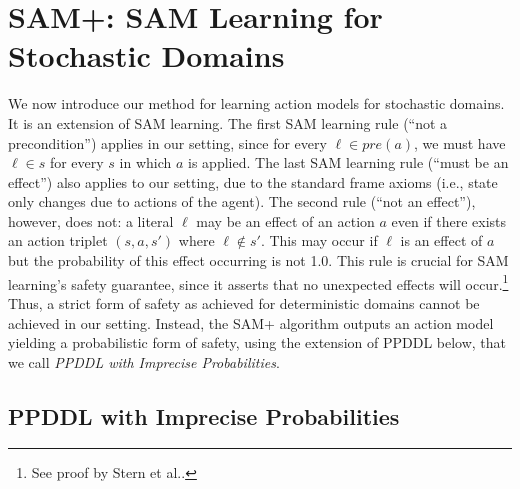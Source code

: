\documentclass[letterpaper]{article} %
\newcommand{\pre}{\textit{pre}}
\newcommand{\tuple}[1]{\ensuremath{\left \langle #1 \right \rangle }}
\begin{document}
\section{SAM+: SAM Learning for Stochastic Domains}



We now introduce our method for learning action models for stochastic domains. It is an extension of SAM learning.
The first SAM learning rule (``not a precondition'') applies in our setting, since for every $\ell\in\pre(a)$, we must have $\ell\in s$ for every $s$ in which $a$ is applied. 
The last SAM learning rule (``must be an effect'') also applies to our setting, due to the standard frame axioms (i.e., state only changes due to actions of the agent). 
The second rule (``not an effect''), however, does not: a literal $\ell$ may be an effect of an action $a$ even if there exists an action triplet $(s,a,s')$ where $\ell\notin s'$. 
This may occur if $\ell$ is an effect of $a$ but the probability of this effect occurring is not 1.0. 
This rule is crucial for SAM learning's safety guarantee, since it asserts that no unexpected effects will occur.\footnote{See proof by Stern et al..} 
Thus, a strict form of safety as achieved for deterministic domains cannot be achieved in our setting. 
Instead, the SAM+ algorithm outputs an action model
yielding a probabilistic form of safety, using the extension of PPDDL below, that we call \emph{PPDDL with Imprecise Probabilities}. 



\subsection{PPDDL with Imprecise Probabilities}
\end{document}
